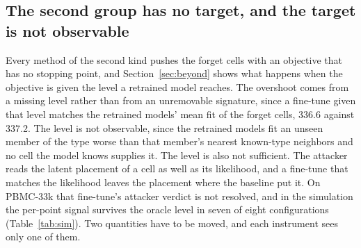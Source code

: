 \documentclass{article}
\begin{document}
\begin{table}[t]
\centering
\caption{The restoration intervention. From the baseline, the published Fisher scrub and the same scrub confined to the retain-active or the retain-null directions (retain Fisher below one hundredth of its mean) are run to matched damage of the forget cells' fit. The two damage levels are the published scrub's and a moderate one of twice the starting forget loss. Each is followed by the methods' Adam fine-tune at $10^{-4}$ on the retain set for 10, 50 and 200 epochs, beside the same fine-tune with no edit. These are the Adam arms of the rerun from the saved edits (Table~\ref{tab:restricted_opt}). The columns give the scrub steps, the forget and held-out fit after the edit, the forget fit after 10, 50 and 200 Adam epochs, the held-out fit after 200, and the audit after 50 and 200. Fits are the mean negative ELBO per cell on the forget cells and a held-out sample; the audit is the reference-free audit point. Generated from \texttt{restricted\_scrub\_test.json}, arms \texttt{edits\_x2\_opt} and \texttt{edits\_opt}.}
\label{tab:restricted}
\small
\resizebox{\textwidth}{!}{}
\end{table}

\subsection{The second group has no target, and the target is not observable}
\label{sec:target}

Every method of the second kind pushes the forget cells with an objective that has no stopping point, and Section~\ref{sec:beyond} shows what happens when the objective is given the level a retrained model reaches. The overshoot comes from a missing level rather than from an unremovable signature, since a fine-tune given that level matches the retrained models' mean fit of the forget cells, 336.6 against 337.2. The level is not observable, since the retrained models fit an unseen member of the type worse than that member's nearest known-type neighbors and no cell the model knows supplies it. The level is also not sufficient. The attacker reads the latent placement of a cell as well as its likelihood, and a fine-tune that matches the likelihood leaves the placement where the baseline put it. On PBMC-33k that fine-tune's attacker verdict is not resolved, and in the simulation the per-point signal survives the oracle level in seven of eight configurations (Table~\ref{tab:sim}). Two quantities have to be moved, and each instrument sees only one of them.
\end{document}
